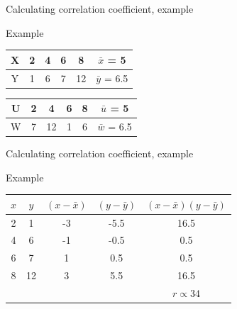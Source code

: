 \documentclass[xcolor=table]{beamer}
\begin{document}
\begin{frame}{Calculating correlation coefficient, example}
\begin{exampleblock}{Example}
{\centering
\begin{tabular}{c | c c c c | c}
X & 2 & 4 & 6 & 8 & $\bar x$ = 5\\
\hline
Y & 1 & 6 & 7 & 12 & $\bar y$ = 6.5
\end{tabular}\qquad
\begin{tabular}{c | c c c c | c}
U & 2 & 4 & 6 & 8 & $\bar u$ = 5\\
\hline
W & 7 & 12 & 1 & 6 & $\bar w$ = 6.5
\end{tabular}
\par}
\end{exampleblock}
\end{frame}


\begin{frame}{Calculating correlation coefficient, example}
\begin{exampleblock}{Example}
{\centering
\begin{tabular}{c | c | c | c | c }
$x$ & $y$ & $(x - \bar x)$ & $(y-\bar y)$ & $(x - \bar x)(y-\bar y)$\\
\hline
2 & 1 & -3 & -5.5 & 16.5\\
4 & 6 & -1 & -0.5 & 0.5\\
6 & 7 & 1 & 0.5 & 0.5\\
8 & 12 & 3 & 5.5 & 16.5\\
\hline
 \multicolumn{4}{r}{} & $r \propto 34$
\end{tabular}\\
\par}
\end{exampleblock}
\end{frame}
\end{document}

